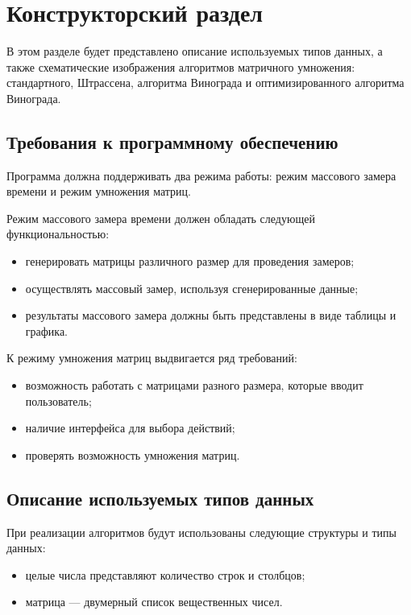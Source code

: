 \chapter{Конструкторский раздел}

В этом разделе будет представлено описание используемых типов данных, а также схематические изображения алгоритмов матричного умножения: 
стандартного, Штрассена, алгоритма Винограда и оптимизированного алгоритма Винограда.

\section{Требования к программному обеспечению}

Программа должна поддерживать два режима работы: режим массового замера времени и режим умножения матриц.

Режим массового замера времени должен обладать следующей функциональностью:
\begin{itemize}
	\item генерировать матрицы различного размер для проведения замеров;
	\item осуществлять массовый замер, используя сгенерированные данные;
	\item результаты массового замера должны быть представлены в виде таблицы и графика.
\end{itemize}

К режиму умножения матриц выдвигается ряд требований:
\begin{itemize}
	\item возможность работать с матрицами разного размера, которые вводит пользователь;
	\item наличие интерфейса для выбора действий;
	\item проверять возможность умножения матриц.
\end{itemize}

\section{Описание используемых типов данных}

При реализации алгоритмов будут использованы следующие структуры и типы данных:
\begin{itemize}
	\item целые числа представляют количество строк и столбцов;
	\item матрица --- двумерный список вещественных чисел.
\end{itemize}

